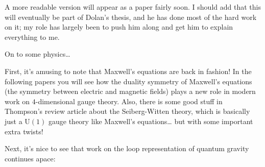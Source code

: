 \documentclass{article}
\def\tightlist{}
\renewcommand{\texttt}[1]{%
  \begingroup
  \ttfamily
  \begingroup\lccode`~=`/\lowercase{\endgroup\def~}{/\discretionary{}{}{}}%
  \begingroup\lccode`~=`[\lowercase{\endgroup\def~}{[\discretionary{}{}{}}%
  \begingroup\lccode`~=`.\lowercase{\endgroup\def~}{.\discretionary{}{}{}}%
  \catcode`/=\active\catcode`[=\active\catcode`.=\active
  \scantokens{#1\noexpand}%
  \endgroup
}
\begin{document}

A more readable version will appear as a paper fairly soon. I should add
that this will eventually be part of Dolan's thesis, and he has done
most of the hard work on it; my role has largely been to push him along
and get him to explain everything to me.

On to some physics\ldots{}

First, it's amusing to note that Maxwell's equations are back in
fashion! In the following papers you will see how the duality symmetry
of Maxwell's equations (the symmetry between electric and magnetic
fields) plays a new role in modern work on \(4\)-dimensional gauge
theory. Also, there is some good stuff in Thompson's review article
about the Seiberg-Witten theory, which is basically just a
\(\mathrm{U}(1)\) gauge theory like Maxwell's equations\ldots{} but with
some important extra twists!


Next, it's nice to see that work on the loop representation of quantum
gravity continues apace:
\end{document}
